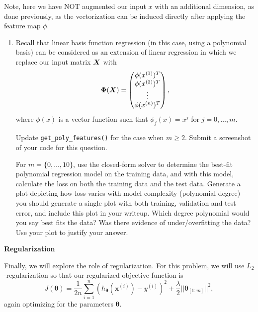 \documentclass[11pt]{article}
\begin{document}
Note, here we have NOT augmented our input $x$ with an additional dimension, as done previously, as the vectorization can be induced directly after applying the feature map $\phi$.

\begin{enumerate}[resume]

\item 
{} Recall that linear basis function regression (in this case, using a polynomial basis) can be considered as an extension of linear regression in which we replace our input matrix $\boldsymbol{X}$ with
\begin{equation*}
\boldsymbol{\Phi}(\boldsymbol{X}) = \begin{pmatrix}
\phi(x^{(1)})^T  \\
\phi(x^{(2)})^T  \\
\vdots  \\
\phi(x^{(n)})^T \\
\end{pmatrix},
\end{equation*}
where $\phi(x)$ is a vector function such that $\phi_j(x) = x^j$ for $j = 0, \ldots, m$.

Update \verb|get_poly_features()| for the case when $m\geq 2$.
Submit a screenshot of your code for this question. 

For $m =\{0, \ldots, 10\}$, use the closed-form solver to determine the best-fit polynomial regression model on the training data, and with this model, calculate the loss on both the training data and the test data. Generate a plot depicting how loss varies with model complexity (polynomial degree) -- you should generate a single plot with both training, validation and test error, and include this plot in your writeup. Which degree polynomial would you say best fits the data? Was there evidence of under/overfitting the data? Use your plot to justify your answer.\\

\end{enumerate}

\vspace{5pt} {\large \textbf{Regularization}}

Finally, we will explore the role of regularization. For this problem, we will use $L_2$-regularization so that our regularized objective function is
\begin{equation*}
J(\boldsymbol{\theta}) = \frac{1}{2n} \sum_{i=1}^{n}{ \left( h_{\boldsymbol{\theta}}(\boldsymbol{x}^{(i)}) - y^{(i)} \right)^2 } + \frac{\lambda}{2} ||\boldsymbol{\theta}_{[1:m]}||^2,
\end{equation*}
again optimizing for the parameters $\boldsymbol{\theta}$.
\end{document}
